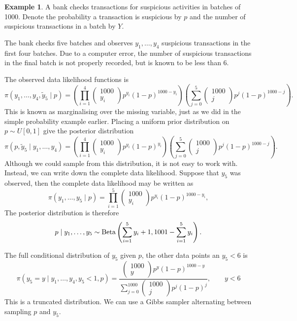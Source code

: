 \documentclass[
]{book}
\theoremstyle{definition}
\theoremstyle{definition}
\newtheorem{example}{Example}[chapter]
\theoremstyle{definition}
\theoremstyle{definition}
\theoremstyle{remark}
\begin{document}
\begin{example}
A bank checks transactions for suspicious activities in batches of 1000. Denote the probability a transaction is suspicious by \(p\) and the number of suspicious transactions in a batch by \(Y\).

The bank checks five batches and observes \(y_1, \ldots, y_4\) suspicious transactions in the first four batches. Due to a computer error, the number of suspicious transactions in the final batch is not properly recorded, but is known to be less than 6.

The observed data likelihood functions is
\[
\pi(y_1, \ldots, y_4, \tilde{y}_5 \mid p) = \left(\prod_{i=1}^4\begin{pmatrix} 1000 \\ y_i \end{pmatrix} p^{y_i}(1-p)^{1000 - y_i} \right)\left(\sum_{j=0}^5\begin{pmatrix} 1000 \\ j \end{pmatrix} p^{j}(1-p)^{1000 - j}\right).
\]
This is known as marginalising over the missing variable, just as we did in the simple probability example earlier. Placing a uniform prior distribution on \(p \sim U[0, 1]\) give the posterior distribution
\[
\pi(p, \tilde{y}_5 \mid y_1, \ldots, y_4)= \left(\prod_{i=1}^4\begin{pmatrix} 1000 \\ y_i \end{pmatrix} p^{y_i}(1-p)^{y_i} \right)\left(\sum_{j=0}^5\begin{pmatrix} 1000 \\ j \end{pmatrix} p^{j}(1-p)^{1000 - j}\right).
\]
Although we could sample from this distribution, it is not easy to work with. Instead, we can write down the complete data likelihood. Suppose that \(y_5\) was observed, then the complete data likelihood may be written as
\[
\pi(y_1, \ldots, y_5 \mid p)  = \prod_{i=1}^5\begin{pmatrix} 1000 \\ y_i \end{pmatrix} p^{y_i}(1-p)^{1000 - y_i},
\]
The posterior distribution is therefore
\[
p \mid y_1, \ldots, y_5 \sim \hbox{Beta}\left(\sum_{i=1}^5 y_i + 1, 1001 - \sum_{i=1}^5 y_i\right).
\]

The full conditional distribution of \(y_5\) given \(p\), the other data points an \(y_5 < 6\) is
\[
  \pi(y_5 = y \mid y_1, \ldots, y_4, y_5 < 1, p) = \frac{\begin{pmatrix} 1000 \\ y \end{pmatrix} p^{y}(1-p)^{1000 - y}}{\sum_{j=0}^{1000}\begin{pmatrix} 1000 \\ j \end{pmatrix} p^{j}(1-p)^{j}}, \qquad y < 6
\]
This is a truncated distribution. We can use a Gibbs sampler alternating between sampling \(p\) and \(y_5\).
\end{example}
\end{document}
